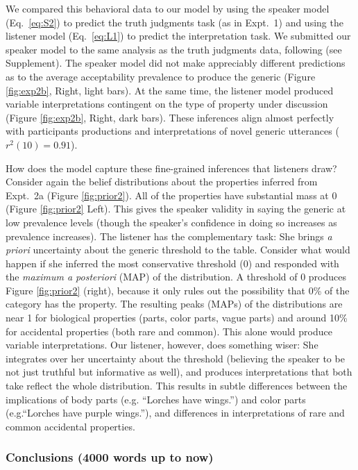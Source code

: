 \documentclass[10pt,letterpaper]{article}
\begin{document}
We compared this behavioral data to our model by using the speaker model (Eq.~\ref{eq:S2}) to predict the truth judgments task (as in Expt.~1) and using the listener model (Eq.~\ref{eq:L1}) to predict the interpretation task. 
We submitted our speaker model to the same analysis as the truth judgments data, following  (see Supplement). 
The speaker model did not make appreciably different predictions as to the average acceptability prevalence to produce the generic (Figure \ref{fig:exp2b}, Right, light bars). 
At the same time, the listener model produced variable interpretations contingent on the type of property under discussion (Figure \ref{fig:exp2b}, Right, dark bars). These inferences align almost perfectly with participants productions and interpretations of novel generic utterances ($r^2(10) = 0.91$). 

How does the model capture these fine-grained inferences that listeners draw?
Consider again the belief distributions about the properties inferred from Expt.~2a (Figure \ref{fig:prior2}). 
All of the properties have substantial mass at 0 (Figure \ref{fig:prior2} Left). 
This gives the speaker validity in saying the generic at low prevalence levels (though the speaker's confidence in doing so increases as prevalence increases).
The listener has the complementary task: She brings \emph{a priori} uncertainty about the generic threshold to the table.
Consider what would happen if she inferred the most conservative threshold (0) and responded with the \emph{maximum a posteriori} (MAP) of the distribution. 
A threshold of 0 produces Figure \ref{fig:prior2} (right), because it only rules out the possibility that 0\% of the category has the property. 
The resulting peaks (MAPs) of the distributions are near 1 for biological properties (parts, color parts, vague parts) and around 10\% for accidental properties (both rare and common). This alone would produce variable interpretations. 
Our listener, however, does something wiser: She integrates over her uncertainty about the threshold (believing the speaker to be not just truthful but informative as well), and produces interpretations that both take reflect the whole distribution.
This results in subtle differences between the implications of body parts (e.g. ``Lorches have wings.'') and  color parts (e.g.``Lorches have purple wings.''), and differences in interpretations of rare and common accidental properties. 


\subsubsection{Conclusions (4000 words up to now)}
\end{document}
